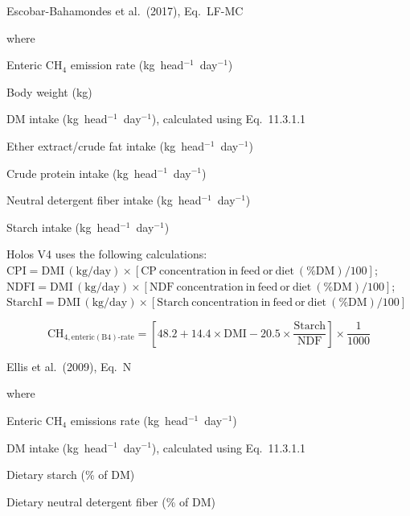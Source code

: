 \noindent Escobar-Bahamondes et al.\ (2017), Eq.~LF-MC

\noindent where
\begin{description}[font=\normalfont, leftmargin=7em, style=sameline, nosep]
    \item[$\mathrm{CH}_{4,\mathrm{enteric}(\mathrm{B3})\mathrm{\text{-}rate}}$]
          Enteric CH$_4$ emission rate (kg~head$^{-1}$~day$^{-1}$)
    \item[$\mathrm{BW}$] Body weight (kg)
    \item[$\mathrm{DMI}$] DM intake (kg~head$^{-1}$~day$^{-1}$), calculated using
          Eq.~11.3.1.1
    \item[$\mathrm{EEI}$] Ether extract/crude fat intake (kg~head$^{-1}$~day$^{-1}$)
    \item[$\mathrm{CPI}$] Crude protein intake (kg~head$^{-1}$~day$^{-1}$)
    \item[$\mathrm{NDFI}$] Neutral detergent fiber intake (kg~head$^{-1}$~day$^{-1}$)
    \item[$\mathrm{StarchI}$] Starch intake (kg~head$^{-1}$~day$^{-1}$)
\end{description}

\noindent Holos V4 uses the following calculations:
$\mathrm{CPI} = \mathrm{DMI}\,(\text{kg/day}) \times [\mathrm{CP\ concentration\ in\ feed\ or\ diet}\ (\%\mathrm{DM})/100]$;
$\mathrm{NDFI} = \mathrm{DMI}\,(\text{kg/day}) \times [\mathrm{NDF\ concentration\ in\ feed\ or\ diet}\ (\%\mathrm{DM})/100]$;
$\mathrm{StarchI} = \mathrm{DMI}\,(\text{kg/day}) \times [\mathrm{Starch\ concentration\ in\ feed\ or\ diet}\ (\%\mathrm{DM})/100]$

\begin{equation}
    \mathrm{CH}_{4,\mathrm{enteric}(\mathrm{B4})\mathrm{\text{-}rate}} =
        \left[48.2 + 14.4 \times \mathrm{DMI}
            - 20.5 \times \frac{\mathrm{Starch}}{\mathrm{NDF}}\right]
        \times \frac{1}{1000}
    \tag{Eq.\ 3.1.1.17}
\end{equation}

\noindent Ellis et al.\ (2009), Eq.~N

\noindent where
\begin{description}[font=\normalfont, leftmargin=9em, style=sameline, nosep]
    \item[$\mathrm{CH}_{4,\mathrm{enteric}(\mathrm{B4})\mathrm{\text{-}rate}}$]
          Enteric CH$_4$ emissions rate (kg~head$^{-1}$~day$^{-1}$)
    \item[$\mathrm{DMI}$] DM intake (kg~head$^{-1}$~day$^{-1}$), calculated using
          Eq.~11.3.1.1
    \item[$\mathrm{Starch}$] Dietary starch (\% of DM)
    \item[$\mathrm{NDF}$] Dietary neutral detergent fiber (\% of DM)
\end{description}

